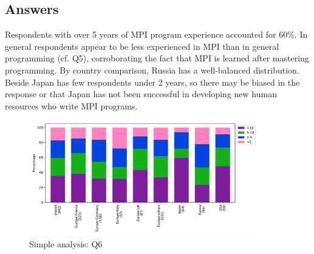 
\subsection{Answers}


Respondents with over 5 years of MPI program experience 
accounted for 60\%. In general respondents appear to be less
experienced in MPI than in general programming (cf. Q5), corroborating 
the fact  
that MPI is learned after mastering programming. By country
comparison, 
Russia has a well-balanced distribution. Beside Japan has 
few respondents under 2 years, so there may be biased in the 
response or that Japan has not been successful in 
developing new human resources who write MPI programs.


\begin{figure}[htb]
\begin{center}
\includegraphics[width=10cm]{../pdfs/Q6.pdf}
\caption{Simple analysis: Q6}
\label{fig:Q6}
\end{center}
\end{figure}
